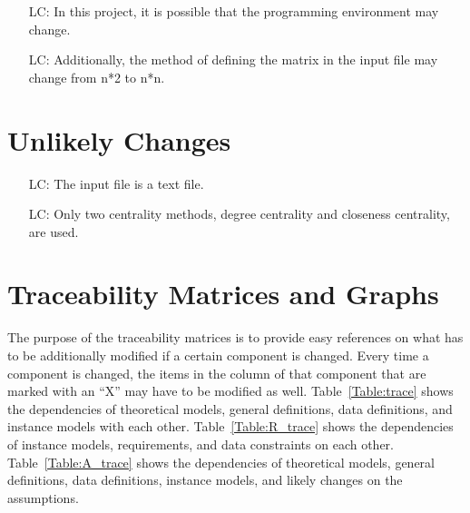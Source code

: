 \documentclass[12pt]{article}
\newcounter{lcnum} %
\begin{document}
\noindent \begin{itemize}

\item[LC\refstepcounter{lcnum}\thelcnum\label{LC_meaningfulLabel}:] In this project, it is possible that the programming environment may change.

\item[LC\refstepcounter{lcnum}\thelcnum\label{LC_meaningfulLabel}:]  Additionally, the method of defining the matrix in the input file may change from n*2 to n*n.

\end{itemize}

\section{Unlikely Changes}    

\noindent \begin{itemize}

\item[LC\refstepcounter{lcnum}\thelcnum\label{LC_meaningfulLabel}:] The input file is a text file.
\item[LC\refstepcounter{lcnum}\thelcnum\label{LC_meaningfulLabel}:] Only two centrality methods, degree centrality and closeness centrality, are used.

\end{itemize}

\section{Traceability Matrices and Graphs}

The purpose of the traceability matrices is to provide easy references on what
has to be additionally modified if a certain component is changed.  Every time a
component is changed, the items in the column of that component that are marked
with an ``X'' may have to be modified as well.  Table~\ref{Table:trace} shows the
dependencies of theoretical models, general definitions, data definitions, and
instance models with each other. Table~\ref{Table:R_trace} shows the
dependencies of instance models, requirements, and data constraints on each
other. Table~\ref{Table:A_trace} shows the dependencies of theoretical models,
general definitions, data definitions, instance models, and likely changes on
the assumptions.
\end{document}

